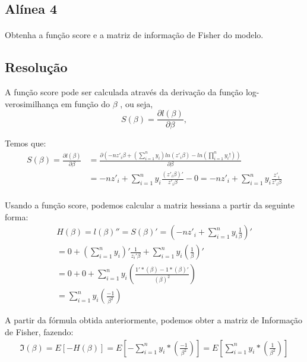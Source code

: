 \documentclass{article}
\begin{document}
				\subsection*{Alínea 4}
			\paragraph{}
				Obtenha a função score e a matriz de informação de Fisher do modelo.

			\subsection*{Resolução}
				A função score pode ser calculada através da derivação da função log-verosimilhança em função do $\beta$ , ou seja, 
				\begin{equation*}
					S(\beta) = \frac{\partial l(\beta)}{\partial \beta},
				\end{equation*}

		
				Temos que:
				\begin{align*}
					S(\beta) = \frac{\partial l(\beta)}{\partial \beta} 
						     &=\frac { \partial \left( -nz'_{i} \beta + \left(\sum_{i=1}^{n} y_{i}\right)ln(z'_{i} \beta) - ln\left(\prod_{i=1}^{n} y_{i}!\right)\right)}{\partial \beta}\\ 
						     &= -nz'_{i} + \sum_{i=1}^{n}y_{i} \frac {(z'_{i}\beta)'}{z'_{i} \beta} - 0 
                                                                     = -nz'_{i} +\sum_{i=1}^{n} y_{i} \frac {z'_{i}}{z'_{i} \beta}\\
				\end{align*}

				Usando a função score, podemos calcular a matriz hessiana a partir da seguinte forma:
			\begin{align*}
				H(\beta)= l(\beta)'' = S(\beta)' = \left(-nz'_{i} + \sum_{i=1}^{n}y_{i} \frac{1}{\beta}\right)' \\
					 = 0 + \left(\sum_{i=1}^{n}y_{i}\right)' \frac{1}{z_{i}'\beta} +  \sum_{i=1}^{n}y_{i} \left(\frac{1}{\beta} \right)' \\
					= 0 + 0 + \sum_{i=1}^{n}y_{i}\left(\frac{1'*(\beta)-1*(\beta)'}{(\beta)^2}\right) \\
					= \sum_{i=1}^{n}y_{i} \left(\frac{-1}{\beta^2}\right)
			\end{align*}

			A partir da fórmula obtida anteriormente, podemos obter a matriz de Informação de Fisher, fazendo:
			\begin{align*}
				\Im(\beta)=E[-H(\beta)] = E\left[- \sum_{i=1}^{n}y_{i} * \left(\frac{-1}{\beta^2}\right) \right] = E\left[\sum_{i=1}^{n}y_{i} * \left(\frac{1}{\beta^2}\right)\right]
			\end{align*}
\end{document}
